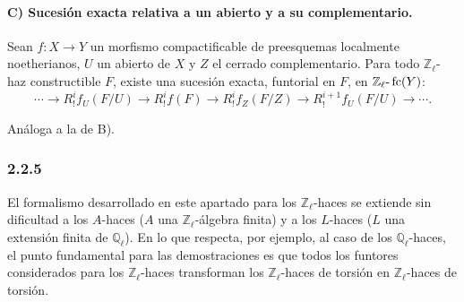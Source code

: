 \paragraph{C) Sucesión exacta relativa a un abierto y a su complementario.}
Sean \(f:X\to Y\) un morfismo compactificable de preesquemas localmente noetherianos, \(U\) un abierto de \(X\) y \(Z\) el cerrado complementario. Para todo \(\mathbb Z_\ell\)-haz constructible \(F\), existe una sucesión exacta, funtorial en \(F\), en \(\mathbb Z_\ell\text{-}\operatorname{fc}(Y)\):
\[
\cdots\longrightarrow R^i_!f_U(F/U)
\longrightarrow R^i_!f(F)
\longrightarrow R^i_!f_Z(F/Z)
\longrightarrow R^{i+1}_!f_U(F/U)
\longrightarrow\cdots .
\]

\begin{prooftext}[Demostración]
Análoga a la de B).
\end{prooftext}

\subsubsection*{2.2.5}
El formalismo desarrollado en este apartado para los \(\mathbb Z_\ell\)-haces se extiende sin dificultad a los \(A\)-haces (\(A\) una \(\mathbb Z_\ell\)-álgebra finita) y a los \(L\)-haces (\(L\) una extensión finita de \(\mathbb Q_\ell\)). En lo que respecta, por ejemplo, al caso de los \(\mathbb Q_\ell\)-haces, el punto fundamental para las demostraciones es que todos los funtores considerados para los \(\mathbb Z_\ell\)-haces transforman los \(\mathbb Z_\ell\)-haces de torsión en \(\mathbb Z_\ell\)-haces de torsión.
